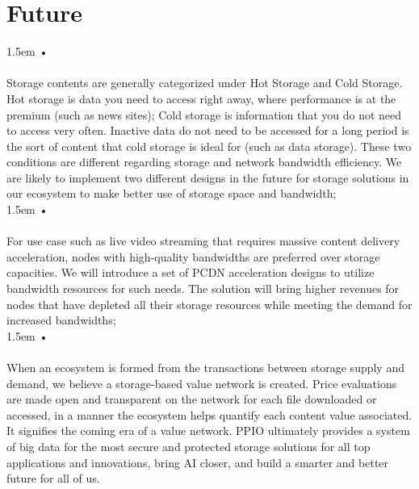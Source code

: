 \documentclass[10pt,a4paper]{article}
\begin{document}
   \section{Future} %

\hangindent 1.5em
\noindent   
• 
  \vspace{-0.6em}
\\ \\Storage contents are generally categorized under Hot Storage and Cold Storage. Hot storage is data you need to access right away, where performance is at the premium (such as news sites); Cold storage is information that you do not need to access very often. Inactive data do not need to be accessed for a long period is the sort of content that cold storage is ideal for (such as data storage). These two conditions are different regarding storage and network bandwidth efficiency. We are likely to implement two different designs in the future for storage solutions in our ecosystem to make better use of storage space and bandwidth;
  \vspace{-0.6em}
\\

\hangindent 1.5em
\noindent   
• 
  \vspace{-0.6em}
\\ \\For use case such as live video streaming that requires massive content delivery acceleration, nodes with high-quality bandwidths are preferred over storage capacities. We will introduce a set of PCDN acceleration designs to utilize bandwidth resources for such needs. The solution will bring higher revenues for nodes that have depleted all their storage resources while meeting the demand for increased bandwidths;
  \vspace{-0.6em}
\\

\hangindent 1.5em
\noindent   
• 
  \vspace{-0.6em}
\\ \\When an ecosystem is formed from the transactions between storage supply and demand, we believe a storage-based value network is created. Price evaluations are made open and transparent on the network for each file downloaded or accessed, in a manner the ecosystem helps quantify each content value associated. It signifies the coming era of a value network. PPIO ultimately provides a system of big data for the most secure and protected storage solutions for all top applications and innovations, bring AI closer, and build a smarter and better future for all of us.
\end{document}
